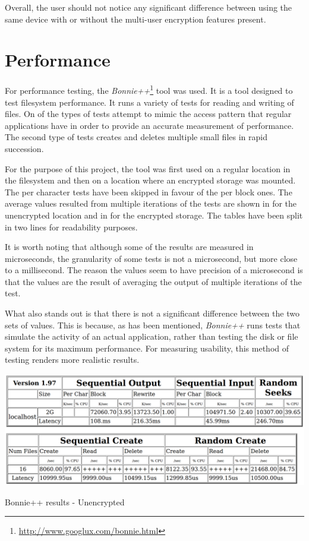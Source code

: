 Overall, the user should not notice any significant difference between using the same device with or without the multi-user encryption features present.

\section{Performance}
\label{sec:perf-eval}

For performance testing, the \textit{Bonnie++}\footnote{\url{http://www.googlux.com/bonnie.html}} tool was used. It is a tool designed to test filesystem performance. It runs a variety of tests for reading and writing of files. On of the types of tests attempt to mimic the access pattern that regular applications have in order to provide an accurate measurement of performance. The second type of tests creates and deletes multiple small files in rapid succession.

For the purpose of this project, the tool was first used on a regular location in the filesystem and then on a location where an encrypted storage was mounted. The per character tests have been skipped in favour of the per block ones. The average values resulted from multiple iterations of the tests are shown in  for the unencrypted location and in  for the encrypted storage. The tables have been split in two lines for readability purposes.

It is worth noting that although some of the results are measured in microseconds, the granularity of some tests is not a microsecond, but more close to a millisecond. The reason the values seem to have precision of a microsecond is that the values are the result of averaging the output of multiple iterations of the test.
\newpage

What also stands out is that there is not a significant difference between the two sets of values. This is because, as has been mentioned, \textit{Bonnie++} runs tests that simulate the activity of an actual application, rather than testing the disk or file system for its maximum performance. For measuring usability, this method of testing renders more realistic results.

\begin{table}[ht]
\centering
    \includegraphics[width=\textwidth]{src/img/perf/results.pdf}
\caption{Bonnie++ results - Unencrypted}
\label{tbl:res-unenc-eval}
\end{table}

